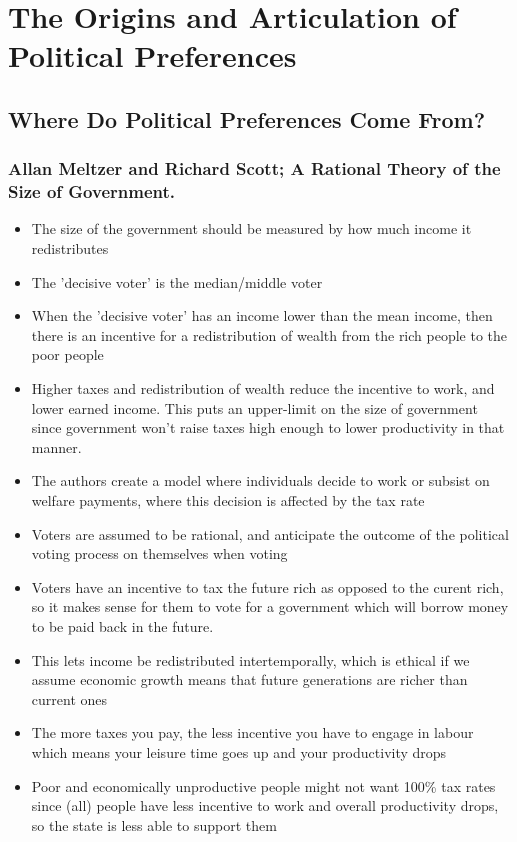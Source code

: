\documentclass[11pt]{article}
\begin{document}
\section{The Origins and Articulation of Political Preferences}
\label{sec:orgfff7714}
\subsection{Where Do Political Preferences Come From?}
\label{sec:org5e8ff9b}
\subsubsection{Allan Meltzer and Richard Scott; A Rational Theory of the Size of Government.}
\label{sec:org2ea6184}
\begin{itemize}
\item The size of the government should be measured by how much income it redistributes
\item The 'decisive voter' is the median/middle voter
\item When the 'decisive voter' has an income lower than the mean income, then there
is an incentive for a redistribution of wealth from the rich people to the
poor people
\item Higher taxes and redistribution of wealth reduce the incentive to work, and
lower earned income. This puts an upper-limit on the size of government since
government won't raise taxes high enough to lower productivity in that manner.
\item The authors create a model where individuals decide to work or subsist on
welfare payments, where this decision is affected by the tax rate
\item Voters are assumed to be rational, and anticipate the outcome of the political
voting process on themselves when voting
\item Voters have an incentive to tax the future rich as opposed to the curent rich,
so it makes sense for them to vote for a government which will borrow money to
be paid back in the future.
\item This lets income be redistributed intertemporally, which is ethical if we
assume economic growth means that future generations are richer than current ones
\item The more taxes you pay, the less incentive you have to engage in labour which
means your leisure time goes up and your productivity drops
\item Poor and economically unproductive people might not want 100\% tax rates since
(all) people have less incentive to work and overall productivity drops, so
the state is less able to support them
\end{itemize}
\end{document}
